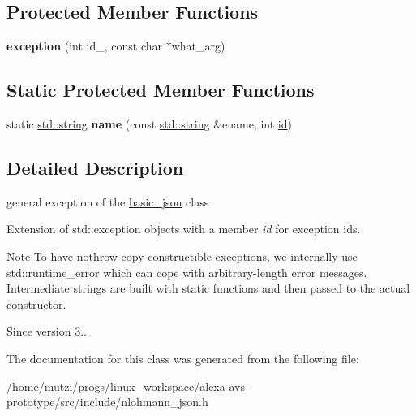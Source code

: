 \subsection*{Protected Member Functions}
\begin{DoxyCompactItemize}
\item 
\mbox{\label{classnlohmann_1_1detail_1_1exception_ae323ad0d53bc724414c2233164e65657}} 
{\bfseries exception} (int id\+\_\+, const char $\ast$what\+\_\+arg)
\end{DoxyCompactItemize}
\subsection*{Static Protected Member Functions}
\begin{DoxyCompactItemize}
\item 
\mbox{\label{classnlohmann_1_1detail_1_1exception_aac7455bbbaed7c01ecd5a2ead336b1ae}} 
static \hyperlink{namespacenlohmann_1_1detail_a90aa5ef615aa8305e9ea20d8a947980fab45cffe084dd3d20d928bee85e7b0f21}{std\+::string} {\bfseries name} (const \hyperlink{namespacenlohmann_1_1detail_a90aa5ef615aa8305e9ea20d8a947980fab45cffe084dd3d20d928bee85e7b0f21}{std\+::string} \&ename, int \hyperlink{classnlohmann_1_1detail_1_1exception_a0d4589a3fb54e81646d986c05efa3b9a}{id})
\end{DoxyCompactItemize}


\subsection{Detailed Description}
general exception of the \hyperlink{classnlohmann_1_1basic__json}{basic\+\_\+json} class 

Extension of std\+::exception objects with a member {\itshape id} for exception ids.

\begin{DoxyNote}{Note}
To have nothrow-\/copy-\/constructible exceptions, we internally use std\+::runtime\+\_\+error which can cope with arbitrary-\/length error messages. Intermediate strings are built with static functions and then passed to the actual constructor.
\end{DoxyNote}
\begin{DoxySince}{Since}
version 3.. 
\end{DoxySince}


The documentation for this class was generated from the following file\+:\begin{DoxyCompactItemize}
\item 
/home/mutzi/progs/linux\+\_\+workspace/alexa-\/avs-\/prototype/src/include/nlohmann\+\_\+json.\+h\end{DoxyCompactItemize}

